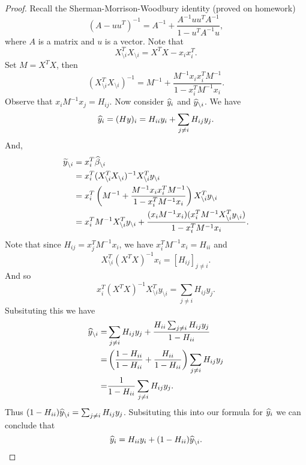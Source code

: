 \begin{proof}
    Recall the Sherman-Morrison-Woodbury identity (proved on homework)
    \[(A-uu^T)^{-1}  = A^{-1}+\frac{A^{-1}uu^TA^{-1}}{1-u^TA^{-1}u},\]
    where $A$ is a matrix and $u$ is a vector. Note that 
    \[X_{\setminus i}^T X_{\setminus i} =X^TX - x_ix_i^T. \]
    Set $M=X^TX$, then 
    \[(X_{\setminus i}^TX_{\setminus i})^{-1} = M^{-1}+\frac{M^{-1}x_ix_i^TM^{-1}}{1-x_i^TM^{-1}x_i}. \]
    Observe that $x_iM^{-1}x_j = H_{ij}$. Now consider $\widehat{y}_i$ and $\widehat{y}_{\setminus i}$. We have
    \[\widehat{y}_i = (Hy)_i = H_{ii}y_i + \sum_{j\neq i}H_{ij}y_j. \]
    And,
    \begin{align*}
        \widetilde{y}_{\setminus i}&=x_i^T \widehat{\beta}_{\setminus i}\\
        &= x_i^T(X_{\setminus i}^TX_{\setminus i})^{-1}X_{\setminus i}^Ty_{\setminus i}\\
        &=x_i^T\left(M^{-1}+\frac{M^{-1}x_ix_i^TM^{-1}}{1-x_i^TM^{-1}x_i}\right)X_{\setminus i}^Ty_{\setminus i}\\
        &=x_i^TM^{-1}X_{\setminus i}^Ty_{\setminus i}+\frac{(x_iM^{-1}x_i)(x_i^TM^{-1}X_{\setminus i}^T y_{\setminus i})}{1-x_i^TM^{-1}x_i}.
    \end{align*}
    Note that since $H_{ij} = x_j^TM^{-1}x_i$, we have $x_i^TM^{-1}x_i = H_{ii}$ and
    \[X^T_{\setminus i}(X^TX)^{-1}x_i = [H_{ij}]_{j\neq i}.\]
    And so
    \[x_i^T(X^TX)^{-1}X_{\setminus i}^Ty_{\setminus i} = \sum_{j \neq i}H_{ij}y_j. \]
    Subsituting this we have
    \begin{align*}
        \widehat{y}_{\setminus i}=&\sum_{j \neq i}H_{ij}y_j+\frac{H_{ii}\sum_{j\neq i}H_{ij}y_j}{1-H_{ii}}\\
        =&\left(\frac{1-H_{ii}}{1-H_{ii}}+\frac{H_{ii}}{1-H_{ii}}\right)\sum_{j\neq i} H_{ij}y_j\\
        =&\frac{1}{1-H_{ii}}\sum_{j\neq i} H_{ij}y_j.
    \end{align*}
    Thus $(1-H_{ii})\widehat{y}_{\setminus i} = \sum_{j\neq i}H_{ij}y_j$. Subsituting this into our formula for $\widehat{y}_i$ we can conclude that 
    \[\widehat{y}_i = H_{ii}y_i + (1-H_{ii})\widehat{y}_{\setminus i}.\qedhere \]
\end{proof}
